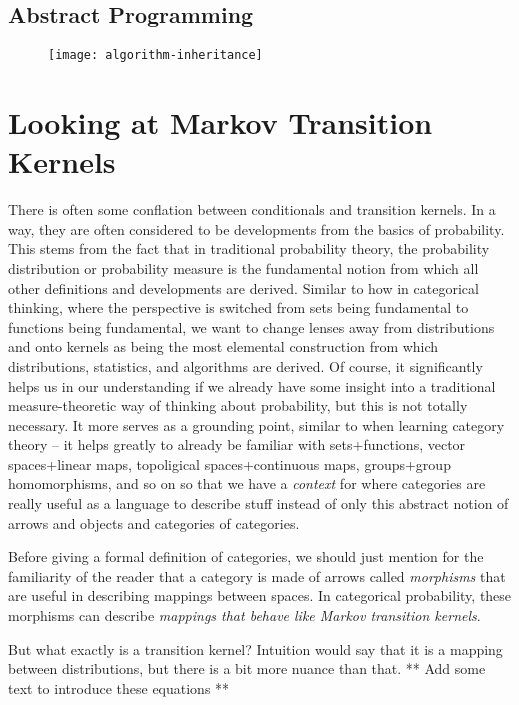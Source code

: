 \section{Abstract Programming}

\begin{figure}[htb]
    \texttt{[image: algorithm-inheritance]}
	\caption{}
    \label{fig:algorithm-inheritance}
\end{figure}

\chapter{Looking at Markov Transition Kernels}

There is often some conflation between conditionals and transition kernels.
In a way, they are often considered to be developments from the basics of probability.
This stems from the fact that in traditional probability theory, the probability distribution or probability measure is the fundamental notion from which all other definitions and developments are derived.
Similar to how in categorical thinking, where the perspective is switched from sets being fundamental to functions being fundamental, we want to change lenses away from distributions and onto kernels as being the most elemental construction from which distributions, statistics, and algorithms are derived. 
Of course, it significantly helps us in our understanding if we already have some insight into a traditional measure-theoretic way of thinking about probability, but this is not totally necessary.
It more serves as a grounding point, similar to when learning category theory -- it helps greatly to already be familiar with sets+functions, vector spaces+linear maps, topoligical spaces+continuous maps, groups+group homomorphisms, and so on so that we have a \emph{context} for where categories are really useful as a language to describe stuff instead of only this abstract notion of arrows and objects and categories of categories.

Before giving a formal definition of categories, we should just mention for the familiarity of the reader that a category is made of arrows called \emph{morphisms} that are useful in describing mappings between spaces. In categorical probability, these morphisms can describe \emph{mappings that behave like Markov transition kernels}.

But what exactly is a transition kernel?
Intuition would say that it is a mapping between distributions, but there is a bit more nuance than that. ** Add some text to introduce these equations **


